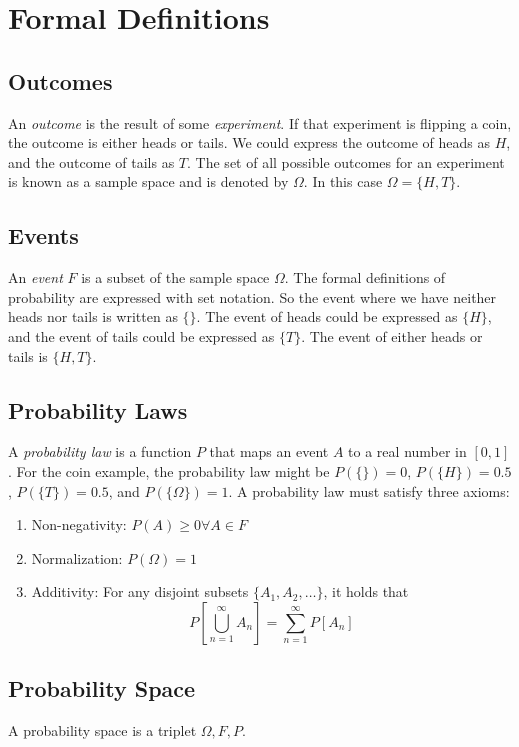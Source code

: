 \section{Formal Definitions}

\subsection{Outcomes}
An \emph{outcome} is the result of some \emph{experiment}.
If that experiment is flipping a coin, the outcome is either
heads or tails. We could express the outcome of heads as $H$,
and the outcome of tails as $T$. The set of all possible
outcomes for an experiment is known as a sample space and is
denoted by $\Omega$. In this case $\Omega = \{H, T\}$.

\subsection{Events}
An \emph{event} $F$ is a subset of the sample space $\Omega$.
The formal definitions of probability are expressed with set
notation. So the event where we have neither heads nor tails is
written as $\{\}$. The event of heads could be expressed as
$\{H\}$, and the event of tails could be expressed as $\{T\}$.
The event of either heads or tails is $\{H, T\}$.

\subsection{Probability Laws}
A \emph{probability law} is a function $P$ that maps an event $A$
to a real number in $[0, 1]$. For the coin example, the probability
law might be $P(\{\}) = 0$, $P(\{H\}) = 0.5$, $P(\{T\}) = 0.5$, and
$P(\{\Omega\}) = 1$. A probability law must satisfy three axioms:
\begin{enumerate}
    \item Non-negativity: $P(A) \geq 0 \forall A \in F$
    \item Normalization: $P(\Omega) = 1$
    \item Additivity: For any disjoint subsets $\{A_1, A_2, \dots\}$,
          it holds that
          \[P\left[\bigcup_{n=1}^{\infty}A_n\right] = \sum_{n=1}^{\infty}P\left[A_n\right]\]
\end{enumerate}

\subsection{Probability Space}
A probability space is a triplet $\Omega, F, P$.
